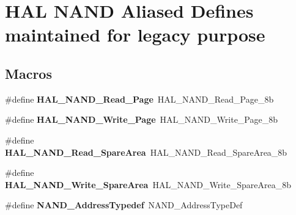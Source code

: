 \hypertarget{group___h_a_l___n_a_n_d___aliased___defines}{\section{H\-A\-L N\-A\-N\-D Aliased Defines maintained for legacy purpose}
\label{group___h_a_l___n_a_n_d___aliased___defines}
}
\subsection*{Macros}
\begin{DoxyCompactItemize}
\item 
\hypertarget{group___h_a_l___n_a_n_d___aliased___defines_ga042b596f4c19c36ccc75780341b36439}{\#define {\bfseries H\-A\-L\-\_\-\-N\-A\-N\-D\-\_\-\-Read\-\_\-\-Page}~H\-A\-L\-\_\-\-N\-A\-N\-D\-\_\-\-Read\-\_\-\-Page\-\_\-8b}\label{group___h_a_l___n_a_n_d___aliased___defines_ga042b596f4c19c36ccc75780341b36439}

\item 
\hypertarget{group___h_a_l___n_a_n_d___aliased___defines_gae90b404d2ee2c8b4b82b949a129b2e61}{\#define {\bfseries H\-A\-L\-\_\-\-N\-A\-N\-D\-\_\-\-Write\-\_\-\-Page}~H\-A\-L\-\_\-\-N\-A\-N\-D\-\_\-\-Write\-\_\-\-Page\-\_\-8b}\label{group___h_a_l___n_a_n_d___aliased___defines_gae90b404d2ee2c8b4b82b949a129b2e61}

\item 
\hypertarget{group___h_a_l___n_a_n_d___aliased___defines_gac185e8ab0a9ca5a4d67d1cde47c881c4}{\#define {\bfseries H\-A\-L\-\_\-\-N\-A\-N\-D\-\_\-\-Read\-\_\-\-Spare\-Area}~H\-A\-L\-\_\-\-N\-A\-N\-D\-\_\-\-Read\-\_\-\-Spare\-Area\-\_\-8b}\label{group___h_a_l___n_a_n_d___aliased___defines_gac185e8ab0a9ca5a4d67d1cde47c881c4}

\item 
\hypertarget{group___h_a_l___n_a_n_d___aliased___defines_ga6f54130ce2531ca52862006428e50e9d}{\#define {\bfseries H\-A\-L\-\_\-\-N\-A\-N\-D\-\_\-\-Write\-\_\-\-Spare\-Area}~H\-A\-L\-\_\-\-N\-A\-N\-D\-\_\-\-Write\-\_\-\-Spare\-Area\-\_\-8b}\label{group___h_a_l___n_a_n_d___aliased___defines_ga6f54130ce2531ca52862006428e50e9d}

\item 
\hypertarget{group___h_a_l___n_a_n_d___aliased___defines_gab3708b27e7380fc5270b5196b71b93aa}{\#define {\bfseries N\-A\-N\-D\-\_\-\-Address\-Typedef}~N\-A\-N\-D\-\_\-\-Address\-Type\-Def}\label{group___h_a_l___n_a_n_d___aliased___defines_gab3708b27e7380fc5270b5196b71b93aa}


\end{DoxyCompactItemize}
